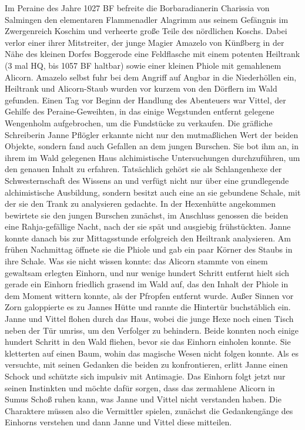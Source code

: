 
Im Peraine des Jahre 1027 BF befreite die Borbaradianerin Charissia von Salmingen den elementaren Flammenadler Alagrimm aus seinem Gefängnis im Zwergenreich Koschim und verheerte große Teile des nördlichen Koschs. Dabei verlor einer ihrer Mitstreiter, der junge Magier Amazelo von Künßberg in der Nähe des kleinen Dorfes Boggerode eine Feldflasche mit einem potenten Heiltrank (3 mal HQ, bis 1057 BF haltbar) sowie einer kleinen Phiole mit gemahlenem Alicorn. Amazelo selbst fuhr bei dem Angriff auf Angbar in die Niederhöllen ein, Heiltrank und Alicorn-Staub wurden vor kurzem von den Dörflern im Wald gefunden. Einen Tag vor Beginn der Handlung des Abenteuers war Vittel, der Gehilfe des Peraine-Geweihten, in das einige Wegstunden entfernt gelegene Wengenholm aufgebrochen, um die Fundstücke zu verkaufen. Die gräfliche Schreiberin Janne Pflögler erkannte nicht nur den mutmaßlichen Wert der beiden Objekte, sondern fand auch Gefallen an dem jungen Burschen. Sie bot ihm an, in ihrem im Wald gelegenen Haus alchimistische Untersuchungen durchzuführen, um den genauen Inhalt zu erfahren. Tatsächlich gehört sie als Schlangenhexe der Schwesternschaft des Wissens an und verfügt nicht nur über eine grundlegende alchimistische Ausbildung, sondern besitzt auch eine an sie gebundene Schale, mit der sie den Trank zu analysieren gedachte.
\platz
In der Hexenhütte angekommen bewirtete sie den jungen Burschen zunächst, im Anschluss genossen die beiden eine Rahja-gefällige Nacht, nach der sie spät und 
ausgiebig frühstückten. Janne konnte danach bis zur Mittagsstunde erfolgreich den Heiltrank analysieren. Am frühen Nachmittag öffnete sie die Phiole und gab ein paar Körner des Staubs in ihre Schale. Was sie nicht wissen konnte: das Alicorn stammte von einem gewaltsam erlegten Einhorn, und nur wenige hundert Schritt entfernt hielt sich gerade ein Einhorn friedlich grasend im Wald auf, das den Inhalt der Phiole in dem Moment wittern konnte, als der Pfropfen entfernt wurde. Außer Sinnen vor Zorn galoppierte es zu Jannes Hütte und rannte die Hintertür buchstäblich ein. Janne und Vittel flohen durch das Haus, wobei die junge Hexe noch einen Tisch neben der Tür umriss, um den Verfolger zu behindern. Beide konnten noch einige hundert Schritt in den Wald fliehen, bevor sie das Einhorn einholen konnte. Sie kletterten auf einen Baum, wohin das magische Wesen nicht folgen konnte. Als es versuchte, mit seinen Gedanken die beiden zu konfrontieren, erlitt Janne einen Schock und schützte sich impulsiv mit Antimagie. Das Einhorn folgt jetzt nur seinen Instinkten und möchte dafür sorgen, dass das zermahlene Alicorn in Sumus Schoß ruhen kann, was Janne und Vittel nicht verstanden haben. Die Charaktere müssen also die Vermittler spielen, zunächst die Gedankengänge des Einhorns verstehen und dann Janne und Vittel diese mitteilen.
